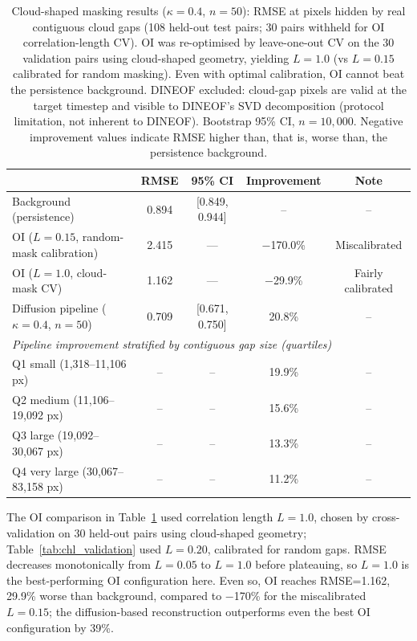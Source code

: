 \documentclass[final,5p,times,twocolumn,authoryear]{elsarticle}
\begin{document}
\begin{table}[t]
\centering
\caption{Cloud-shaped masking results ($\kappa=0.4$, $n=50$): RMSE at
pixels hidden by real contiguous cloud gaps (108 held-out test pairs;
30 pairs withheld for OI correlation-length CV). OI was re-optimised
by leave-one-out CV on the 30 validation pairs using cloud-shaped
geometry, yielding $L=1.0$ (vs $L=0.15$ calibrated for random masking).
Even with optimal calibration, OI cannot beat the persistence background.
DINEOF excluded: cloud-gap pixels are valid at the target timestep and
visible to DINEOF's SVD decomposition (protocol limitation, not
inherent to DINEOF). Bootstrap 95\% CI, $n=10{,}000$. Negative
improvement values indicate RMSE higher than, that is, worse than,
the persistence background.}
\label{tab:cloud_mask}
\begin{tabular}{lcccc}
\toprule
 & RMSE & 95\% CI & Improvement & Note \\
\midrule
Background (persistence)                & 0.894 & [0.849, 0.944] & -- & -- \\
OI ($L=0.15$, random-mask calibration)  & 2.415 & --- & $-$170.0\% & Miscalibrated \\
OI ($L=1.0$, cloud-mask CV)             & 1.162 & --- & $-$29.9\% & Fairly calibrated \\
Diffusion pipeline ($\kappa=0.4$, $n=50$) & 0.709 & [0.671, 0.750] & 20.8\% & -- \\
\midrule
\multicolumn{5}{l}{\textit{Pipeline improvement stratified by contiguous gap size (quartiles)}} \\
\midrule
Q1 small (1{,}318--11{,}106 px)       & -- & -- & 19.9\% & -- \\
Q2 medium (11{,}106--19{,}092 px)     & -- & -- & 15.6\% & -- \\
Q3 large (19{,}092--30{,}067 px)      & -- & -- & 13.3\% & -- \\
Q4 very large (30{,}067--83{,}158 px) & -- & -- & 11.2\% & -- \\
\bottomrule
\end{tabular}
\end{table}

The OI comparison in Table~\ref{tab:cloud_mask} used correlation
length $L=1.0$, chosen by cross-validation on 30 held-out pairs using
cloud-shaped geometry; Table~\ref{tab:chl_validation} used $L=0.20$,
calibrated for random gaps. RMSE decreases monotonically from
$L=0.05$ to $L=1.0$ before plateauing, so $L=1.0$ is the
best-performing OI configuration here. Even so, OI reaches
RMSE=1.162, 29.9\% worse than background, compared to $-$170\% for
the miscalibrated $L=0.15$; the diffusion-based reconstruction
outperforms even the best OI configuration by 39\%.
\end{document}
